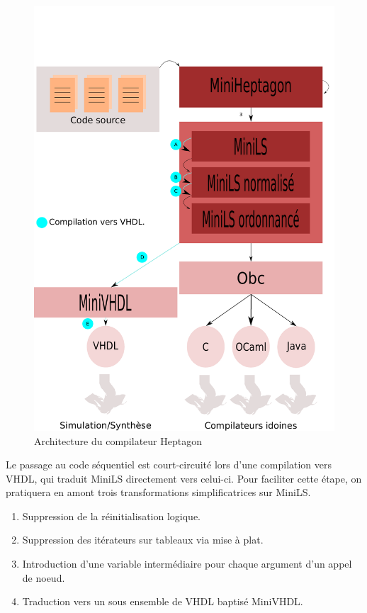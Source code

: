 \documentclass[a4paper]{article}
\newcommand{\LANG}{Heptagon}
\begin{document}
\begin{figure}[htp]
  \centering
  \includegraphics[scale=0.5]{archi}
  \caption{Architecture du compilateur \LANG{}}
  \label{fig:archi}
\end{figure}

Le passage au code s\'equentiel est court-circuit\'e lors d'une compilation vers
VHDL, qui traduit MiniLS directement vers celui-ci. Pour faciliter cette \'etape,
on pratiquera en amont trois transformations simplificatrices sur MiniLS.

\renewcommand{\labelenumi}{\Alph{enumi}}
\begin{enumerate}
\item Suppression de la r\'einitialisation logique.
\item Suppression des it\'erateurs sur tableaux via mise \`a plat.
\item Introduction d'une variable interm\'ediaire pour chaque argument d'un appel
  de noeud.
\item Traduction vers un sous ensemble de VHDL baptis\'e MiniVHDL.
\end{enumerate}
\end{document}
